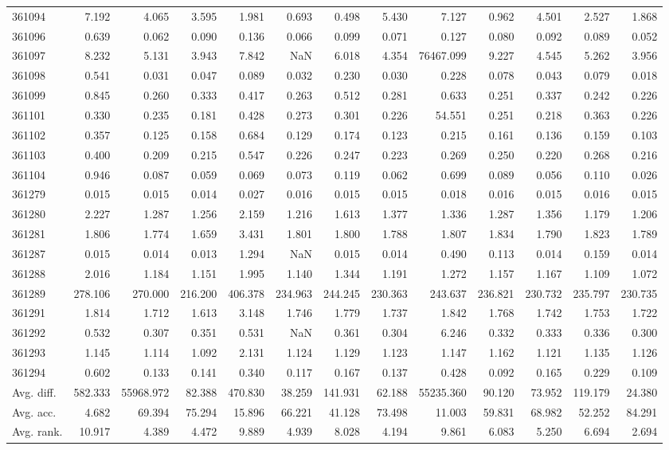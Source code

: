 \begin{tabular}{lrrrrrrrrrrrr}
361094 & 7.192 & 4.065 & 3.595 & 1.981 & 0.693 & 0.498 & 5.430 & 7.127 & 0.962 & 4.501 & 2.527 & 1.868 \\
361096 & 0.639 & 0.062 & 0.090 & 0.136 & 0.066 & 0.099 & 0.071 & 0.127 & 0.080 & 0.092 & 0.089 & 0.052 \\
361097 & 8.232 & 5.131 & 3.943 & 7.842 & NaN & 6.018 & 4.354 & 76467.099 & 9.227 & 4.545 & 5.262 & 3.956 \\
361098 & 0.541 & 0.031 & 0.047 & 0.089 & 0.032 & 0.230 & 0.030 & 0.228 & 0.078 & 0.043 & 0.079 & 0.018 \\
361099 & 0.845 & 0.260 & 0.333 & 0.417 & 0.263 & 0.512 & 0.281 & 0.633 & 0.251 & 0.337 & 0.242 & 0.226 \\
361101 & 0.330 & 0.235 & 0.181 & 0.428 & 0.273 & 0.301 & 0.226 & 54.551 & 0.251 & 0.218 & 0.363 & 0.226 \\
361102 & 0.357 & 0.125 & 0.158 & 0.684 & 0.129 & 0.174 & 0.123 & 0.215 & 0.161 & 0.136 & 0.159 & 0.103 \\
361103 & 0.400 & 0.209 & 0.215 & 0.547 & 0.226 & 0.247 & 0.223 & 0.269 & 0.250 & 0.220 & 0.268 & 0.216 \\
361104 & 0.946 & 0.087 & 0.059 & 0.069 & 0.073 & 0.119 & 0.062 & 0.699 & 0.089 & 0.056 & 0.110 & 0.026 \\
361279 & 0.015 & 0.015 & 0.014 & 0.027 & 0.016 & 0.015 & 0.015 & 0.018 & 0.016 & 0.015 & 0.016 & 0.015 \\
361280 & 2.227 & 1.287 & 1.256 & 2.159 & 1.216 & 1.613 & 1.377 & 1.336 & 1.287 & 1.356 & 1.179 & 1.206 \\
361281 & 1.806 & 1.774 & 1.659 & 3.431 & 1.801 & 1.800 & 1.788 & 1.807 & 1.834 & 1.790 & 1.823 & 1.789 \\
361287 & 0.015 & 0.014 & 0.013 & 1.294 & NaN & 0.015 & 0.014 & 0.490 & 0.113 & 0.014 & 0.159 & 0.014 \\
361288 & 2.016 & 1.184 & 1.151 & 1.995 & 1.140 & 1.344 & 1.191 & 1.272 & 1.157 & 1.167 & 1.109 & 1.072 \\
361289 & 278.106 & 270.000 & 216.200 & 406.378 & 234.963 & 244.245 & 230.363 & 243.637 & 236.821 & 230.732 & 235.797 & 230.735 \\
361291 & 1.814 & 1.712 & 1.613 & 3.148 & 1.746 & 1.779 & 1.737 & 1.842 & 1.768 & 1.742 & 1.753 & 1.722 \\
361292 & 0.532 & 0.307 & 0.351 & 0.531 & NaN & 0.361 & 0.304 & 6.246 & 0.332 & 0.333 & 0.336 & 0.300 \\
361293 & 1.145 & 1.114 & 1.092 & 2.131 & 1.124 & 1.129 & 1.123 & 1.147 & 1.162 & 1.121 & 1.135 & 1.126 \\
361294 & 0.602 & 0.133 & 0.141 & 0.340 & 0.117 & 0.167 & 0.137 & 0.428 & 0.092 & 0.165 & 0.229 & 0.109 \\
Avg. diff. & 582.333 & 55968.972 & 82.388 & 470.830 & 38.259 & 141.931 & 62.188 & 55235.360 & 90.120 & 73.952 & 119.179 & 24.380 \\
Avg. acc. & 4.682 & 69.394 & 75.294 & 15.896 & 66.221 & 41.128 & 73.498 & 11.003 & 59.831 & 68.982 & 52.252 & 84.291 \\
Avg. rank. & 10.917 & 4.389 & 4.472 & 9.889 & 4.939 & 8.028 & 4.194 & 9.861 & 6.083 & 5.250 & 6.694 & 2.694 \\
\bottomrule
\end{tabular}
